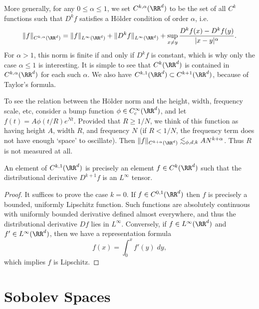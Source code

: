 More generally, for any $0 \leq \alpha \leq 1$, we set $C^{k,\alpha}(\RR^d)$ to be the set of all $C^k$ functions such that $D^k f$ satisfies a H\"{o}lder condition of order $\alpha$, i.e.
%
\[ \| f \|_{C^{k,\alpha}(\RR^d)} = \| f \|_{L^\infty(\RR^d)} + \| D^k f \|_{L^\infty(\RR^d)} + \sup_{x \neq y} \frac{D^kf(x) - D^k f(y)}{|x - y|^\alpha}. \]
%
For $\alpha > 1$, this norm is finite if and only if $D^k f$ is constant, which is why only the case $\alpha \leq 1$ is interesting. It is simple to see that $C^k(\RR^d)$ is contained in $C^{k,\alpha}(\RR^d)$ for each such $\alpha$. We also have $C^{k,1}(\RR^d) \subset C^{k+1}(\RR^d)$, because of Taylor's formula.

\begin{example}
    To see the relation between the H\"{o}lder norm and the height, width, frequency scale, etc, consider a bump function $\phi \in C_c^\infty(\RR^d)$, and let $f(t) = A \phi(t/R) e^{Nt}$. Provided that $R \geq 1/N$, we think of this function as having height $A$, width $R$, and frequency $N$ (if $R < 1/N$, the frequency term does not have enough `space' to oscillate). Then $\| f \|_{C^{k+\alpha}(\RR^d)} \lesssim_{\phi,d,k} A N^{k+\alpha}$. Thus $R$ is not measured at all.
\end{example}

\begin{lemma}
    An element of $C^{k,1}(\RR^d)$ is precisely an element $f \in C^k(\RR^d)$ such that the distributional derivative $D^{k+1}f$ is an $L^\infty$ tensor.
\end{lemma}
\begin{proof}
    It suffices to prove the case $k = 0$. If $f \in C^{0,1}(\RR^d)$ then $f$ is precisely a bounded, uniformly Lipschitz function. Such functions are absolutely continuous with uniformly bounded derivative defined almost everywhere, and thus the distributional derivative $Df$ lies in $L^\infty$. Conversely, if $f \in L^\infty(\RR^d)$ and $f' \in L^\infty(\RR^d)$, then we have a representation formula
    \[ f(x) = \int_0^x f'(y)\; dy, \]
    which implies $f$ is Lipschitz.
\end{proof}






\chapter{Sobolev Spaces}

